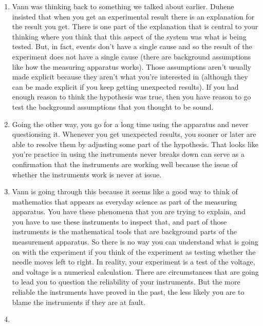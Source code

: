 \documentclass[12pt]{article}
\theoremstyle{definition}
\begin{document}
\begin{enumerate}
    \itemsep0em 
    \item
        Vann was thinking back to something we talked about earlier. Duhene
        insisted that when you get an experimental result there is an
        explanation for the result you get. There is one part of the
        explanation that is central to your thinking where you think that this
        aspect of the system was what is being tested. But, in fact, events
        don't have a single cause and so the result of the experiment does not
        have a single cause (there are background assumptions like how the
        measuring apparatus works). Those assumptions aren't usually made
        explicit because they aren't what you're interested in (although they
        can be made explicit if you keep getting unexpected results). If you
        had enough reason to think the hypothesis was true, then you have
        reason to go test the background assumptions that you thought to be
        sound.
    \item
        Going the other way, you go for a long time using the apparatus and
        never questionsing it. Whenever you get unexpected results, you sooner
        or later are able to resolve them by adjusting some part of the
        hypothesis. That looks like you're practice in using the instruments
        never breaks down can serve as a confirmation that the instruments are
        working well because the issue of whether the instruments work is never
        at issue. 
    \item
        Vann is going through this because it seems like a good way to think of
        mathematics that appears as everyday science as part of the measuring
        apparatus. You have these phenomena that you are trying to explain, and
        you have to use these instruments to inspect that, and part of those
        instruments is the mathematical tools that are background parts of the
        measurement apparatus. So there is no way you can understand what is
        going on with the experiment if you think of the experiment as testing
        whether the needle moves left to right. In reality, your experiment is
        a test of the voltage, and voltage is a numerical calculation. There
        are circumstances that are going to lead you to question the
        reliability of your instruments. But the more reliable the instruments
        have proved in the past, the less likely you are to blame the
        instruments if they are at fault.
    \item

\end{enumerate}
\end{document}
